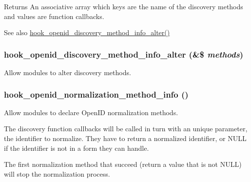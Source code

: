 \begin{DoxyReturn}{Returns}
An associative array which keys are the name of the discovery methods and values are function callbacks.
\end{DoxyReturn}
\begin{DoxySeeAlso}{See also}
\hyperlink{group__hooks_ga0b118d8fd00181113e6925c08c9dfb91}{hook\_\-openid\_\-discovery\_\-method\_\-info\_\-alter()} 
\end{DoxySeeAlso}
\hypertarget{group__hooks_ga0b118d8fd00181113e6925c08c9dfb91}{
\subsubsection[{hook\_\-openid\_\-discovery\_\-method\_\-info\_\-alter}]{\setlength{\rightskip}{0pt plus 5cm}hook\_\-openid\_\-discovery\_\-method\_\-info\_\-alter (\&\$ {\em methods})}}
\label{group__hooks_ga0b118d8fd00181113e6925c08c9dfb91}
Allow modules to alter discovery methods. \hypertarget{group__hooks_ga53b4878d46aae5aea7de146ab543c585}{
\subsubsection[{hook\_\-openid\_\-normalization\_\-method\_\-info}]{\setlength{\rightskip}{0pt plus 5cm}hook\_\-openid\_\-normalization\_\-method\_\-info ()}}
\label{group__hooks_ga53b4878d46aae5aea7de146ab543c585}
Allow modules to declare OpenID normalization methods.

The discovery function callbacks will be called in turn with an unique parameter, the identifier to normalize. They have to return a normalized identifier, or NULL if the identifier is not in a form they can handle.

The first normalization method that succeed (return a value that is not NULL) will stop the normalization process.

